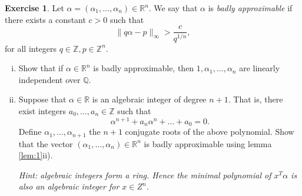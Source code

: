 \documentclass[12pt,a4paper]{article}
\theoremstyle{plain}
\newtheorem*{Sol*}{Solution}
\theoremstyle{definition}
\newtheorem{Ex}{Exercise}
\def \Q {\mathbb Q}
\def \R {\mathbb R}
\def \Z {\mathbb Z}
\newif\ifsolutions
\newcommand{\exercise}[2]{
			\begin{Ex} #1 \end{Ex}
			\ifsolutions  \begin{Sol*} #2 \end{Sol*} \bigskip \else \bigskip  \fi
		}
\begin{document}
\exercise{
	Let $\alpha = (\alpha_1, \dots, \alpha_n) \in \R^n$. We say that $\alpha$ is \emph{badly approximable} if there exists a constant $c > 0$ such that
		\[ \| q \alpha - p \|_\infty > \frac{c}{q^{1/n}}, \]
	for all integers $q \in \Z, p \in \Z^n$.

	\begin{enumerate}[i)]
		\item Show that if $\alpha \in \R^n$ is badly approximable, then $1, \alpha_1, \dots, \alpha_n$ are linearly independent over $\Q$.
		\item Suppose that $\alpha \in \R$ is an algebraic integer of degree $n+1$. That is, there exist integers $a_0, \dots, a_{n} \in \Z$ such that
			\[ \alpha^{n+1} + a_{n} \alpha^{n} + \dots +  a_{0} = 0. \]
		Define $\alpha_1, \dots, \alpha_{n+1}$ the $n+1$ conjugate roots of the above polynomial.
		Show that the vector $(\alpha_1, \dots, \alpha_n) \in \R^n$ is badly approximable using lemma \ref{lem:1}ii).

		\emph{Hint: algebraic integers form a ring. Hence the minimal polynomial of $x^T \alpha$ is also an algebraic integer for $x \in Z^n$.}
	\end{enumerate}
}
{}
\end{document}
